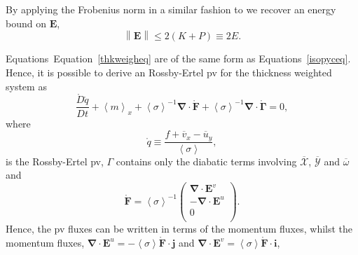 \documentclass[12pt,a4paper]{report}
\newcommand*\thkmean[1]{\overline{#1}}
\newcommand*\nthkmean[1]{\left\langle{#1}\right\rangle}
\newcommand*\spec[1]{\mathring{#1}}
\newcommand*\equref[1]{Equation~\eqref{#1}}
\begin{document}
                     By applying the Frobenius norm in a similar fashion to 
                     \cite{marshall2012framework} we recover an energy bound on
                      $\boldsymbol{E}$,
                      \begin{equation}
                      {\left\|\boldsymbol{E}\right\|\leq 2\left(K+P\right)\equiv 2E}.
                      \end{equation} 
                      
                      Equations~\equref{thkweigheq} are of the same form as Equations~\ref{isopyceq}.
                      Hence, it is possible to derive an
                      Rossby-Ertel \gls{pv} for the thickness weighted system
                      as
                      \begin{equation}
                      \frac{\spec{D} \spec{q}}{D t} + \nthkmean{m}_{x} 
                      +\nthkmean{\sigma}^{-1}\boldsymbol{\nabla}\cdot\spec{\boldsymbol{F}}
                      +\nthkmean{\sigma}^{-1}\boldsymbol{\nabla}\cdot\spec{\boldsymbol{\Gamma}}=0,
                      \end{equation} 
                      where
                      \begin{equation}
                      \spec{q}\equiv\frac{f+\thkmean{v}_{x}-\thkmean{u}_{y}}{\nthkmean{\sigma}},
                      \end{equation}
                      is the Rossby-Ertel \gls{pv}, $\Gamma$ contains only the diabatic terms involving $\thkmean{\mathcal{X}} $, $\thkmean{\mathcal{Y}} $ and $\thkmean{\omega} $ and 
                      \begin{equation}
                      \spec{\boldsymbol{F}}=\nthkmean{\sigma}^{-1}\left(
                      \begin{array}{c}
                      \boldsymbol{\nabla}\cdot\boldsymbol{E}^v \\
                      -\boldsymbol{\nabla}\cdot\boldsymbol{E}^u\\
                      0 \\
                      \end{array}\right).
                      \end{equation}
                      Hence, the \gls{pv} fluxes can be written in terms of
                      the momentum fluxes, whilst the momentum fluxes, ${\boldsymbol{\nabla}\cdot\boldsymbol{E}^u = -\nthkmean{\sigma} \spec{\boldsymbol{F}}\cdot\boldsymbol{j}}$ and                      ${\boldsymbol{\nabla}\cdot\boldsymbol{E}^v = \nthkmean{\sigma} \spec{\boldsymbol{F}}\cdot\boldsymbol{i}}$,
\end{document}
